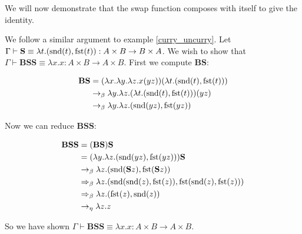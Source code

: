 We will now demonstrate that the swap function composes with itself to give the identity.

\begin{example}\label{swap_swap}
    We follow a similar argument to example \ref{curry_uncurry}. Let $\Gamma \vdash \mathbf{S} \equiv \lambda t . (\mathrm{snd}(t), \mathrm{fst}(t)) : A \times B \to B \times A$. We wish to show that $\Gamma \vdash \mathbf{B}\mathbf{S}\mathbf{S} \equiv \lambda x . x : A \times B \to A \times B$. First we compute $\mathbf{B}\mathbf{S}$:
    
    \begin{equation*}
        \begin{aligned}
            \mathbf{B}\mathbf{S} &= (\lambda x . \lambda y. \lambda z . x(yz))(\lambda t . (\mathrm{snd}(t),\mathrm{fst}(t))) \\
            &\to_\beta \lambda y . \lambda z . (\lambda t . (\mathrm{snd}(t), \mathrm{fst}(t)))(y z) \\
            &\to_\beta \lambda y . \lambda z . (\mathrm{snd}(yz), \mathrm{fst}(yz)) 
        \end{aligned}
    \end{equation*}
    
    Now we can reduce $\mathbf{B}\mathbf{S}\mathbf{S}$:
    
    \begin{equation*}
        \begin{aligned}
            \mathbf{B}\mathbf{S}\mathbf{S} &= (\mathbf{B} \mathbf{S})\mathbf{S} \\
            &= (\lambda y. \lambda z. (\mathrm{snd} (yz), \mathrm{fst}(yz)))\mathbf{S} \\
            &\to_\beta \lambda z. (\mathrm{snd} (\mathbf{S} z), \mathrm{fst}(\mathbf{S} z)) \\
            &\Rightarrow_\beta \lambda z. (\mathrm{snd} (\mathrm{snd}(z), \mathrm{fst}(z)), \mathrm{fst} (\mathrm{snd}(z), \mathrm{fst}(z))) \\
            &\Rightarrow_\beta \lambda z. (\mathrm{fst}(z), \mathrm{snd}(z)) \\
            &\to_\eta \lambda z . z
        \end{aligned}
    \end{equation*}
    
    So we have shown $\Gamma \vdash \mathbf{B}\mathbf{S}\mathbf{S} \equiv \lambda x . x : A \times B \to A \times B$.
\end{example}





